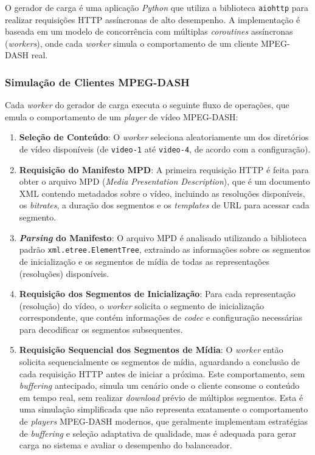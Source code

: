 O gerador de carga é uma aplicação \textit{Python} que utiliza a biblioteca \texttt{aiohttp} para realizar requisições HTTP assíncronas de alto desempenho. A implementação é baseada em um modelo de concorrência com múltiplas \textit{coroutines} assíncronas (\textit{workers}), onde cada \textit{worker} simula o comportamento de um cliente MPEG-DASH real.

\subsubsection{Simulação de Clientes MPEG-DASH}

Cada \textit{worker} do gerador de carga executa o seguinte fluxo de operações, que emula o comportamento de um \textit{player} de vídeo MPEG-DASH:

\begin{enumerate}
    \item \textbf{Seleção de Conteúdo}: O \textit{worker} seleciona aleatoriamente um dos diretórios de vídeo disponíveis (de \texttt{video-1} até \texttt{video-4}, de acordo com a configuração).
    
    \item \textbf{Requisição do Manifesto MPD}: A primeira requisição HTTP é feita para obter o arquivo MPD (\textit{Media Presentation Description}), que é um documento XML contendo metadados sobre o vídeo, incluindo as resoluções disponíveis, os \textit{bitrates}, a duração dos segmentos e os \textit{templates} de URL para acessar cada segmento.
    
    \item \textbf{\textit{Parsing} do Manifesto}: O arquivo MPD é analisado utilizando a biblioteca padrão \texttt{xml.\allowbreak etree.ElementTree}, extraindo as informações sobre os segmentos de inicialização e os segmentos de mídia de todas as representações (resoluções) disponíveis.
    
    \item \textbf{Requisição dos Segmentos de Inicialização}: Para cada representação (resolução) do vídeo, o \textit{worker} solicita o segmento de inicialização correspondente, que contém informações de \textit{codec} e configuração necessárias para decodificar os segmentos subsequentes.
    
    \item \textbf{Requisição Sequencial dos Segmentos de Mídia}: O \textit{worker} então solicita sequencialmente os segmentos de mídia, aguardando a conclusão de cada requisição HTTP antes de iniciar a próxima. Este comportamento, sem \textit{buffering} antecipado, simula um cenário onde o cliente consome o conteúdo em tempo real, sem realizar \textit{download} prévio de múltiplos segmentos. Esta é uma simulação simplificada que não representa exatamente o comportamento de \textit{players} MPEG-DASH modernos, que geralmente implementam estratégias de \textit{buffering} e seleção adaptativa de qualidade, mas é adequada para gerar carga no sistema e avaliar o desempenho do balanceador.
\end{enumerate}

